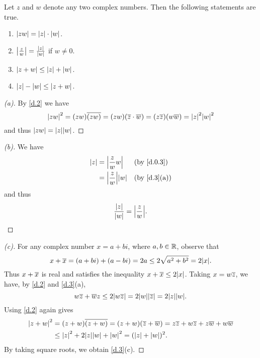 \begin{thm}\label{d.3}
  Let \(z\) and \(w\) denote any two complex numbers.
  Then the following statements are true.
  \begin{enumerate}
    \item \(\left\lvert zw\right\rvert = \left\lvert z\right\rvert \cdot \left\lvert w\right\rvert\).
    \item \(\left\lvert\frac{z}{w}\right\rvert = \frac{\left\lvert z\right\rvert}{\left\lvert w\right\rvert}\) if \(w \neq 0\).
    \item \(\left\lvert z + w\right\rvert \leq \left\lvert z\right\rvert + \left\lvert w\right\rvert\).
    \item \(\left\lvert z\right\rvert - \left\lvert w\right\rvert \leq \left\lvert z + w\right\rvert\).
  \end{enumerate}
\end{thm}

\begin{proof}[(a)]
  By \cref{d.2} we have
  \[
    \abs{zw}^2 = (zw) \conj{(zw)} = (zw) (\conj{z} \cdot \conj{w}) = (z \conj{z}) (w \conj{w}) = \abs{z}^2 \abs{w}^2
  \]
  and thus \(\abs{zw} = \abs{z} \abs{w}\).
\end{proof}

\begin{proof}[(b)]
  We have
  \begin{align*}
    \abs{z} & = \abs{\frac{z}{w} w}       &  & \by{d.0.3}  \\
            & = \abs{\frac{z}{w}} \abs{w} &  & \by{d.3}[a]
  \end{align*}
  and thus
  \[
    \frac{\abs{z}}{\abs{w}} = \abs{\frac{z}{w}}.
  \]
\end{proof}

\begin{proof}[(c)]
  For any complex number \(x = a + bi\), where \(a, b \in \mathbb{R}\), observe that
  \[
    x + \conj{x} = (a + bi) + (a - bi) = 2a \leq 2 \sqrt{a^2 + b^2} = 2 \abs{x}.
  \]
  Thus \(x + \overline{x}\) is real and satisfies the inequality \(x + \conj{x} \leq 2 \abs{x}\).
  Taking \(x = w \overline{z}\), we have, by \cref{d.2} and \cref{d.3}(a),
  \[
    w \conj{z} + \conj{w} z \leq 2 \abs{w \conj{z}} = 2 \abs{w} \abs{\conj{z}} = 2 \abs{z} \abs{w}.
  \]
  Using \cref{d.2} again gives
  \begin{align*}
    \abs{z + w}^2 & = (z + w) \conj{(z + w)} = (z + w) (\conj{z} + \conj{w}) = z \conj{z} + w \conj{z} + z \conj{w} + w \conj{w} \\
                  & \leq \abs{z}^2 + 2 \abs{z} \abs{w} + \abs{w}^2 = (\abs{z} + \abs{w})^2.
  \end{align*}
  By taking square roots, we obtain \cref{d.3}(c).
\end{proof}

